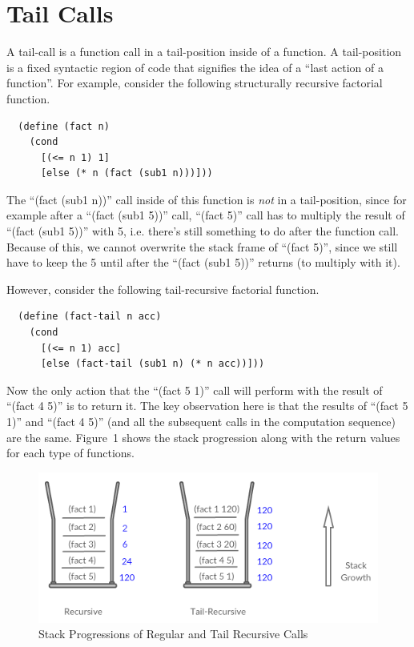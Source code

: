 \documentclass[12pt]{article}
\begin{document}
\section{Tail Calls}

A tail-call is a function call in a tail-position inside of a
function. A tail-position is a fixed syntactic region of code that
signifies the idea of a ``last action of a function''. For example,
consider the following structurally recursive factorial function.

\begin{verbatim}
  (define (fact n)
    (cond
      [(<= n 1) 1]
      [else (* n (fact (sub1 n)))]))
\end{verbatim}

The ``(fact (sub1 n))'' call inside of this function is \emph{not} in
a tail-position, since for example after a ``(fact (sub1 5))'' call,
``(fact 5)'' call has to multiply the result of ``(fact (sub1 5))''
with 5, i.e. there's still something to do after the function
call. Because of this, we cannot overwrite the stack frame of ``(fact
5)'', since we still have to keep the 5 until after the ``(fact (sub1
5))'' returns (to multiply with it).

However, consider the following tail-recursive factorial function.

\begin{verbatim}
  (define (fact-tail n acc)
    (cond
      [(<= n 1) acc]
      [else (fact-tail (sub1 n) (* n acc))]))
\end{verbatim}

Now the only action that the ``(fact 5 1)'' call will perform with the
result of ``(fact 4 5)'' is to return it. The key observation here is
that the results of ``(fact 5 1)'' and ``(fact 4 5)'' (and all the
subsequent calls in the computation sequence) are the same. Figure~1
shows the stack progression along with the return values for each type
of functions.

\begin{figure}[htb!]
  \centering
  \includegraphics[scale=0.5]{stack.png}
  \caption{Stack Progressions of Regular and Tail Recursive Calls}
\end{figure}
\end{document}
